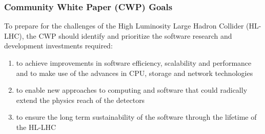 \begin{frame}
\frametitle{Community White Paper (CWP) Goals}

To prepare for the challenges of the High Luminosity Large Hadron Collider (HL-LHC), the CWP should identify and prioritize the software research and development investments required:

\begin{enumerate}
\item to achieve improvements in software efficiency, scalability and performance and to make use of the advances in CPU, storage and network technologies
\item to enable new approaches to computing and software that could radically extend the physics reach of the detectors
\item to ensure the long term sustainability of the software through the lifetime of the HL-LHC
\end{enumerate}

\end{frame}



